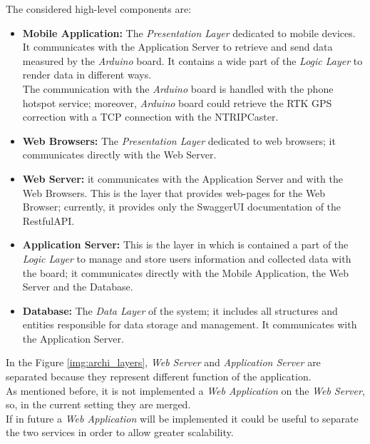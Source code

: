 The considered high-level components are:
\begin{itemize}
  \setlength{\itemindent}{-.4in}
  
  \item[] \textbf{Mobile Application:} The \textit{Presentation Layer} dedicated to mobile devices. It communicates with the Application Server to retrieve and send data measured by the \textit{Arduino} board. It contains a wide part of the \textit{Logic Layer} to render data in different ways.\\
  The communication with the \textit{Arduino} board is handled with the phone hotspot service; moreover, \textit{Arduino} board could retrieve the RTK GPS correction with a TCP connection with the NTRIPCaster.
  
  \item[] \textbf{Web Browsers:} The \textit{Presentation Layer} dedicated to web browsers; it communicates directly with the Web Server.
  
  \item[] \textbf{Web Server:} it communicates with the Application Server and with the Web Browsers. This is the layer that provides web-pages for the Web Browser; currently, it provides only the SwaggerUI documentation of the RestfulAPI.
  
  \item[] \textbf{Application Server:} This is the layer in which is contained a part of the \textit{Logic Layer} to manage and store users information and collected data with the board; it communicates directly with the Mobile Application, the Web Server and the Database.
  
  \item[] \textbf{Database:}  The \textit{Data Layer} of the system; it includes all structures and entities responsible for data storage and management. It communicates with the Application Server.
\end{itemize}

In the Figure \ref{img:archi_layers}, \textit{Web Server} and \textit{Application Server} are separated because they represent different function of the application.\\
As mentioned before, it is not implemented a \textit{Web Application} on the \textit{Web Server}, so, in the current setting they are merged.\\ If in future a \textit{Web Application} will be implemented it could be useful to separate the two services in order to allow greater scalability.
\clearpage

